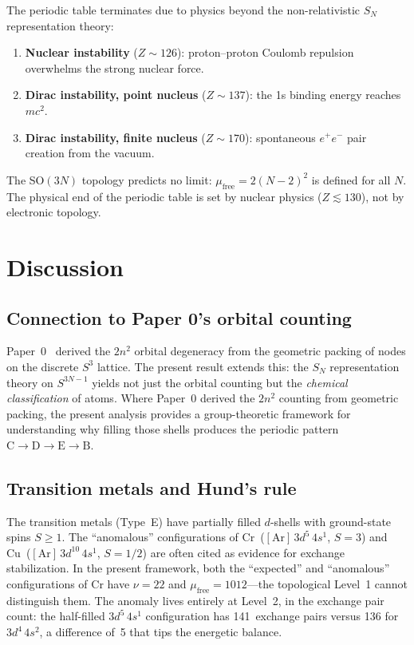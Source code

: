 \documentclass[aps,prl,twocolumn,superscriptaddress,longbibliography]{revtex4-2}
\newcommand{\mufree}{\mu_{\mathrm{free}}}
\begin{document}
The periodic table terminates due to physics beyond the
non-relativistic $S_N$ representation theory:
\begin{enumerate}
  \item \textbf{Nuclear instability} ($Z \sim 126$): proton--proton
    Coulomb repulsion overwhelms the strong nuclear force.
  \item \textbf{Dirac instability, point nucleus} ($Z \sim 137$): the
    1s binding energy reaches $mc^2$.
  \item \textbf{Dirac instability, finite nucleus} ($Z \sim 170$):
    spontaneous $e^+e^-$ pair creation from the vacuum.
\end{enumerate}
The SO$(3N)$ topology predicts no limit: $\mufree = 2(N-2)^2$ is
defined for all $N$.  The physical end of the periodic table is set by
nuclear physics ($Z \lesssim 130$), not by electronic topology.


\section{Discussion}
\label{sec:discussion}

\subsection{Connection to Paper 0's orbital counting}

Paper~0~\cite{loutey_paper0} derived the $2n^2$ orbital degeneracy
from the geometric packing of nodes on the discrete $S^3$ lattice.
The present result extends this: the $S_N$ representation theory on
$S^{3N-1}$ yields not just the orbital counting but the
\emph{chemical classification} of atoms.  Where Paper~0 derived the $2n^2$ counting from geometric packing,
the present analysis provides a group-theoretic framework for
understanding why filling those shells produces the periodic pattern
$\mathrm{C} \to \mathrm{D} \to \mathrm{E} \to \mathrm{B}$.

\subsection{Transition metals and Hund's rule}

The transition metals (Type~E) have partially filled $d$-shells with
ground-state spins $S \geq 1$.  The ``anomalous'' configurations of
Cr~($[\mathrm{Ar}]\,3d^5\,4s^1$, $S = 3$) and
Cu~($[\mathrm{Ar}]\,3d^{10}\,4s^1$, $S = 1/2$) are often cited as
evidence for exchange stabilization.  In the present framework, both
the ``expected'' and ``anomalous'' configurations of Cr have
$\nu = 22$ and $\mufree = 1012$---the topological Level~1 cannot
distinguish them.  The anomaly lives entirely at Level~2, in the
exchange pair count: the half-filled $3d^5\,4s^1$ configuration has
141~exchange pairs versus 136 for $3d^4\,4s^2$, a difference of~5
that tips the energetic balance.
\end{document}
